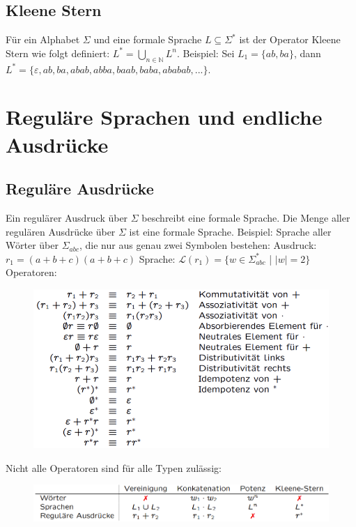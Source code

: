 \documentclass[12pt,a4paper]{article}
\begin{document}
\subsection{Kleene Stern}
Für ein Alphabet $\varSigma$ und eine formale Sprache $L \subseteq \varSigma^*$ ist der Operator Kleene Stern wie folgt definiert: $L^* = \underset{n \in \mathbb{N}}{\bigcup} L^n$.\newline \newline
Beispiel: Sei $L_1 = \{ ab, ba\}$, dann $L^* = \{\varepsilon, ab, ba, abab, abba, baab, baba, ababab, ...\}$.

\section{Reguläre Sprachen und endliche Ausdrücke}
\subsection{Reguläre Ausdrücke}
Ein regulärer Ausdruck über $\varSigma$ beschreibt eine formale Sprache.\newline
Die Menge aller regulären Ausdrücke über $\varSigma$ ist eine formale Sprache.\newline\newline
Beispiel: Sprache aller Wörter über $\varSigma_{abc}$, die nur aus genau zwei Symbolen bestehen:\newline
Ausdruck: $r_1 = (a + b + c)(a + b + c)$\newline
Sprache: $\mathcal{L}(r_1) = \{ w \in \varSigma_{abc}^*$ | $|w| = 2\}$\newpage
\noindent Operatoren:
\begin{center}
	\begin{figure}[!h]
		\includegraphics[width=\textwidth]{Bilder/RegulaereAusdruecke_Operatoren.PNG}
	\end{figure}
\end{center}
Nicht alle Operatoren sind für alle Typen zulässig:
\begin{center}
	\begin{figure}[!h]
		\includegraphics[width=\textwidth]{Bilder/Zulaessige_Operatoren.PNG}
	\end{figure}
\end{center}
\end{document}
